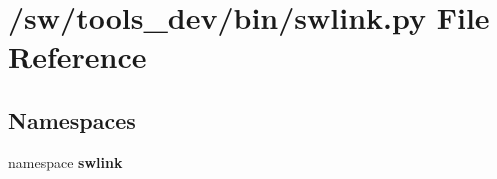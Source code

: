 \section{/sw/tools\_\-dev/bin/swlink.py File Reference}
\label{swlink_8py}
\subsection*{Namespaces}
\begin{CompactItemize}
\item 
namespace {\bf swlink}
\end{CompactItemize}
